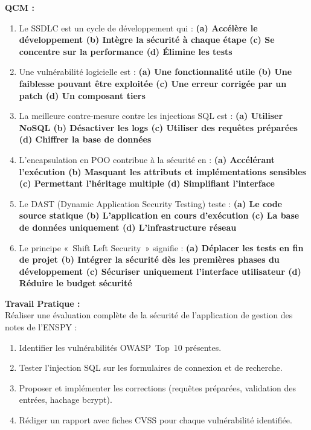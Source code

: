 \begin{boxexo}
\textbf{QCM :}
\begin{enumerate}
    \item Le SSDLC est un cycle de développement qui : \textbf{(a) Accélère le développement \quad (b) Intègre la sécurité à chaque étape \quad (c) Se concentre sur la performance \quad (d) Élimine les tests}
    \item Une vulnérabilité logicielle est : \textbf{(a) Une fonctionnalité utile \quad (b) Une faiblesse pouvant être exploitée \quad (c) Une erreur corrigée par un patch \quad (d) Un composant tiers}
    \item La meilleure contre-mesure contre les injections SQL est : \textbf{(a) Utiliser NoSQL \quad (b) Désactiver les logs \quad (c) Utiliser des requêtes préparées \quad (d) Chiffrer la base de données}
    \item L'encapsulation en POO contribue à la sécurité en : \textbf{(a) Accélérant l'exécution \quad (b) Masquant les attributs et implémentations sensibles \quad (c) Permettant l'héritage multiple \quad (d) Simplifiant l'interface}
    \item Le DAST (Dynamic Application Security Testing) teste : \textbf{(a) Le code source statique \quad (b) L'application en cours d'exécution \quad (c) La base de données uniquement \quad (d) L'infrastructure réseau}
    \item Le principe «~Shift Left Security~» signifie : \textbf{(a) Déplacer les tests en fin de projet \quad (b) Intégrer la sécurité dès les premières phases du développement \quad (c) Sécuriser uniquement l'interface utilisateur \quad (d) Réduire le budget sécurité}
\end{enumerate}

\textbf{Travail Pratique :}\\
Réaliser une évaluation complète de la sécurité de l'application de gestion des notes de l'ENSPY :
\begin{enumerate}
    \item Identifier les vulnérabilités OWASP~Top~10 présentes.
    \item Tester l'injection SQL sur les formulaires de connexion et de recherche.
    \item Proposer et implémenter les corrections (requêtes préparées, validation des entrées, hachage bcrypt).
    \item Rédiger un rapport avec fiches CVSS pour chaque vulnérabilité identifiée.
\end{enumerate}
\end{boxexo}
